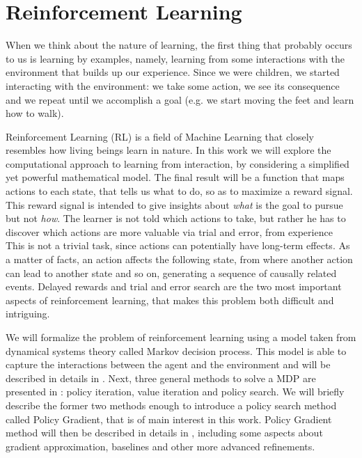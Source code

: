\chapter{Reinforcement Learning}
\label{ch:rl}
\thispagestyle{empty}

When we think about the nature of learning, the first thing that probably occurs to us is learning by examples, namely, learning from some interactions with the environment that builds up our experience. Since we were children, we started interacting with the environment: we take some action, we see its consequence and we repeat until we accomplish a goal (e.g. we start moving the feet and learn how to walk). 


Reinforcement Learning (RL) is a field of Machine Learning that closely resembles how living beings learn in nature. In this work we will explore the computational approach to learning from interaction, by considering a simplified yet powerful mathematical model. The final result will be a function that maps actions to each state, that tells us what to do, so as to maximize a reward signal. This reward signal is intended to give insights about \textit{what} is the goal to pursue but not \textit{how}. The learner is not told which actions to take, but rather he has to discover which actions are more valuable via trial and error, from experience \\
This is not a trivial task, since actions can potentially have long-term effects. As a matter of facts, an action affects the following state, from where another action can lead to another state and so on, generating a sequence of causally related events. Delayed rewards and trial and error search are the two most important aspects of reinforcement learning, that makes this problem both difficult and intriguing.

We will formalize the problem of reinforcement learning using a model taken from dynamical systems theory called Markov decision process. This model is able to capture the interactions between the agent and the environment and will be described in details in . Next, three general methods to solve a MDP are presented in : policy iteration, value iteration and policy search. We will briefly describe the former two methods enough to introduce a policy search method called Policy Gradient, that is of main interest in this work. Policy Gradient method will then be described in details in , including some aspects about gradient approximation, baselines and other more advanced refinements.








